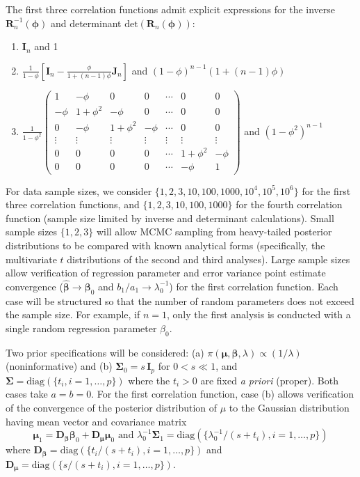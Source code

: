 \documentclass[11pt, oneside]{article}   	%
\begin{document}
The first three correlation functions admit explicit expressions for the inverse $\mathbf{R}_n^{-1}(\mathbf{\phi})$ and determinant $\mbox{det} \left( \mathbf{R}_n(\mathbf{\phi}) \right)$:
\begin{enumerate}
\item $\mathbf{I}_n$ and 1
\item $ \frac{1}{1-\phi} \left[ \mathbf{I}_n - \frac{\phi}{1+(n-1)\phi} \mathbf{J}_n \right]$ and $(1-\phi)^{n-1}(1+(n-1)\phi)$
\item $\frac{1}{1-\phi^2} \left(
\begin{array}{ccccccc}
1 & -\phi & 0 & 0 & \cdots & 0 & 0\\
-\phi & 1+\phi^2 & -\phi & 0 & \cdots & 0 & 0\\
0 & -\phi & 1+\phi^2 & -\phi & \cdots & 0 & 0\\
\vdots & \vdots & \vdots & \vdots & \vdots & \vdots & \vdots \\
0 & 0 & 0 & 0 & \cdots & 1+\phi^2 & -\phi \\
0 & 0 & 0 & 0 & \cdots & -\phi & 1
\end{array} \right)$ and $(1-\phi^2)^{n-1}$
\end{enumerate}

For data sample sizes, we consider $\{ 1,2,3,10,100,1000,10^4,10^5,10^6\}$ for the first three correlation functions, and $\{ 1,2,3,10,100,1000\}$ for the fourth correlation function (sample size limited by inverse and determinant calculations).  Small sample sizes $\{ 1,2,3 \}$ will allow MCMC sampling from heavy-tailed posterior distributions to be compared with known analytical forms (specifically, the multivariate $t$ distributions of the second and third analyses).  Large sample sizes allow verification of regression parameter and error variance point estimate convergence ($\hat{\mathbf{\beta}} \rightarrow \mathbf{\beta}_0$ and $b_1/a_1 \rightarrow \lambda_0^{-1}$) for the first correlation function.  Each case will be structured so that the number of random parameters does not exceed the sample size.  For example, if $n=1$, only the first analysis is conducted with a single random regression parameter $\beta_0$.

Two prior specifications will be considered:  (a) $\pi(\mathbf{\mu}, \mathbf{\beta}, \lambda) \propto (1/\lambda)$ (noninformative) and (b) $\mathbf{\Sigma}_0 = s \, \mathbf{I}_p$ for $0 < s \ll 1$, and $\mathbf{\Sigma} = \mbox{diag}(\{ t_i, i=1,\ldots,p \})$ where the $t_i > 0$ are fixed \emph{a priori} (proper).  Both cases take $a = b = 0$.  For the first correlation function, case (b) allows verification of the convergence of the posterior distribution of $\mu$ to the Gaussian distribution having mean vector and covariance matrix
\[
\mathbf{\mu}_1 = \mathbf{D}_{\mathbf{\beta}} \mathbf{\beta}_0 + \mathbf{D}_{\mathbf{\mu}} \mathbf{\mu}_0 \mbox{ and } \lambda_0^{-1} \mathbf{\Sigma}_1 = \mbox{diag}( \{ \lambda_0^{-1}/(s+t_i), i=1,\ldots, p \})
\]
where $\mathbf{D}_{\mathbf{\beta}} = \mbox{diag}( \{ t_i/(s+t_i), i=1,\ldots, p \})$ and $\mathbf{D}_{\mathbf{\mu}} = \mbox{diag}( \{ s/(s+t_i), i=1,\ldots, p \})$.
\end{document}
